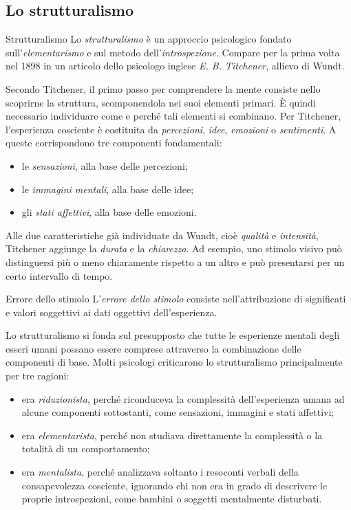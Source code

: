 \documentclass[a4paper]{article}
\begin{document}
\subsection{Lo strutturalismo}
\begin{snippetdefinition}{Strutturalismo}
    Lo \emph{strutturalismo} è un approccio psicologico fondato sull'\emph{elementarismo} e sul metodo dell'\emph{introspezione}. Compare per la prima volta nel 1898 in un articolo dello psicologo inglese \emph{E. B. Titchener}, allievo di Wundt.
\end{snippetdefinition}
Secondo Titchener, il primo passo per comprendere la mente consiste nello scoprirne la struttura, scomponendola nei suoi elementi primari. È quindi necessario individuare come e perché tali elementi si combinano.
Per Titchener, l'esperienza cosciente è costituita da \emph{percezioni}, \emph{idee}, \emph{emozioni} o \emph{sentimenti}. A queste corrispondono tre componenti fondamentali:
\begin{itemize}
    \item le \emph{sensazioni}, alla base delle percezioni;
    \item le \emph{immagini mentali}, alla base delle idee;
    \item gli \emph{stati affettivi}, alla base delle emozioni.
\end{itemize}
Alle due caratteristiche già individuate da Wundt, cioè \emph{qualità} e \emph{intensità}, Titchener aggiunge la \emph{durata} e la \emph{chiarezza}. Ad esempio, uno stimolo visivo può distinguersi più o meno chiaramente rispetto a un altro e può presentarsi per un certo intervallo di tempo.
\begin{snippetdefinition}{Errore dello stimolo}
    L'\emph{errore dello stimolo} consiste nell'attribuzione di significati e valori soggettivi ai dati oggettivi dell'esperienza.
\end{snippetdefinition}
Lo strutturalismo si fonda sul presupposto che tutte le esperienze mentali degli esseri umani possano essere comprese attraverso la combinazione delle componenti di base.
Molti psicologi criticarono lo strutturalismo principalmente per tre ragioni:
\begin{itemize}
    \item era \emph{riduzionista}, perché riconduceva la complessità dell'esperienza umana ad alcune componenti sottostanti, come sensazioni, immagini e stati affettivi;
    \item era \emph{elementarista}, perché non studiava direttamente la complessità o la totalità di un comportamento;
    \item era \emph{mentalista}, perché analizzava soltanto i resoconti verbali della consapevolezza cosciente, ignorando chi non era in grado di descrivere le proprie introspezioni, come bambini o soggetti mentalmente disturbati.
\end{itemize}
\end{document}
